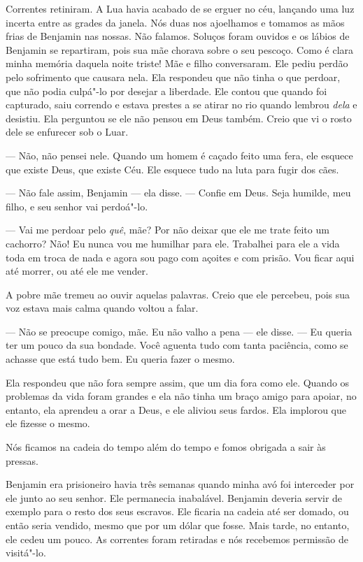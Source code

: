 Correntes retiniram. A Lua havia acabado de se erguer no céu, lançando
uma luz incerta entre as grades da janela. Nós duas nos ajoelhamos e
tomamos as mãos frias de Benjamin nas nossas. Não falamos. Soluços foram
ouvidos e os lábios de Benjamin se repartiram, pois sua mãe chorava
sobre o seu pescoço. Como é clara minha memória daquela noite triste!
Mãe e filho conversaram. Ele pediu perdão pelo sofrimento que causara
nela. Ela respondeu que não tinha o que perdoar, que não podia culpá"-lo
por desejar a liberdade. Ele contou que quando foi capturado, saiu
correndo e estava prestes a se atirar no rio quando lembrou \emph{dela}
e desistiu. Ela perguntou se ele não pensou em Deus também. Creio que vi
o rosto dele se enfurecer sob o Luar.

--- Não, não pensei nele. Quando um homem é caçado feito uma fera, ele
esquece que existe Deus, que existe Céu. Ele esquece tudo na luta para
fugir dos cães.

--- Não fale assim, Benjamin --- ela
disse. --- Confie em Deus. Seja humilde, meu filho, e seu senhor vai
perdoá"-lo.

--- Vai me perdoar pelo \emph{quê},
mãe? Por não deixar que ele me trate feito um cachorro? Não! Eu nunca
vou me humilhar para ele. Trabalhei para ele a vida toda em troca de
nada e agora sou pago com açoites e com prisão. Vou ficar aqui até
morrer, ou até ele me vender.

A pobre mãe tremeu ao ouvir aquelas
palavras. Creio que ele percebeu, pois sua voz estava mais calma quando
voltou a falar.

--- Não se preocupe comigo, mãe. Eu não valho a pena --- ele disse. ---
Eu queria ter um pouco da sua bondade. Você aguenta tudo com tanta
paciência, como se achasse que está tudo bem. Eu queria fazer o mesmo.

Ela respondeu que não fora sempre
assim, que um dia fora como ele. Quando os problemas da vida foram
grandes e ela não tinha um braço amigo para apoiar, no entanto, ela
aprendeu a orar a Deus, e ele aliviou seus fardos. Ela implorou que ele
fizesse o mesmo.

Nós ficamos na cadeia do tempo além do
tempo e fomos obrigada a sair às pressas.

Benjamin era prisioneiro havia três
semanas quando minha avó foi interceder por ele junto ao seu senhor. Ele
permanecia inabalável. Benjamin deveria servir de exemplo para o resto
dos seus escravos. Ele ficaria na cadeia até ser domado, ou então seria
vendido, mesmo que por um dólar que fosse. Mais tarde, no entanto, ele
cedeu um pouco. As correntes foram retiradas e nós recebemos permissão
de visitá"-lo.


